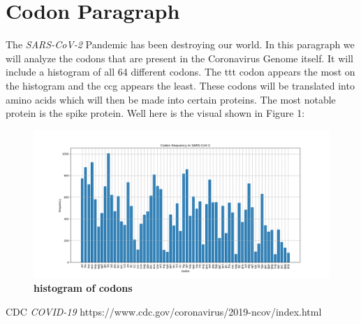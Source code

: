 \section{Codon Paragraph}

The \textit{SARS-CoV-2} Pandemic has been destroying our world.
In this paragraph we will analyze the codons that are present in the Coronavirus Genome itself.
It will include a histogram of all 64 different codons.
The ttt codon appears the most on the histogram and the ccg appears the least.
These codons will be translated into amino acids which will then be made into certain proteins.
The most notable protein is the spike protein. Well here is the visual shown in Figure 1:

\begin{figure}
    \centering
    \includegraphics{histogram}
    \caption{\textbf{histogram of codons}}
\end{figure}

\begin{thebibliography}{1}

 CDC \emph{COVID-19} https://www.cdc.gov/coronavirus/2019-ncov/index.html

\end{thebibliography}
